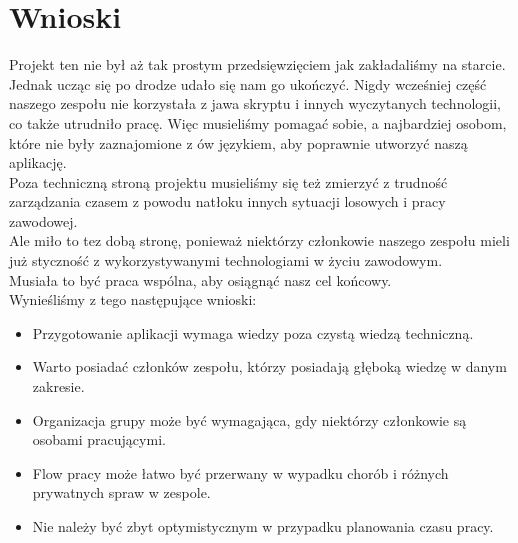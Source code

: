 \documentclass{article}
\begin{document}
\section{Wnioski}
   Projekt ten nie był aż tak prostym przedsięwzięciem jak zakładaliśmy na starcie. Jednak ucząc się po drodze udało się nam go ukończyć. Nigdy wcześniej część naszego zespołu nie korzystała z jawa skryptu i innych wyczytanych technologii, co także utrudniło pracę. Więc musieliśmy pomagać sobie, a najbardziej osobom, które nie były zaznajomione z ów językiem, aby poprawnie utworzyć naszą aplikację.\\
    Poza techniczną stroną projektu musieliśmy się też zmierzyć z trudność zarządzania czasem z powodu natłoku innych sytuacji losowych i pracy zawodowej.\\
    Ale miło to tez dobą stronę, ponieważ niektórzy członkowie naszego zespołu mieli już styczność z wykorzystywanymi technologiami w życiu zawodowym.\\
    Musiała to być praca wspólna, aby osiągnąć nasz cel końcowy.\\
    
    Wynieśliśmy z tego następujące wnioski:\\
    \begin{itemize}
        \item Przygotowanie aplikacji wymaga wiedzy poza czystą wiedzą techniczną.
        \item Warto posiadać członków zespołu, którzy posiadają głęboką wiedzę w danym zakresie.
        \item Organizacja grupy może być wymagająca, gdy niektórzy członkowie są osobami pracującymi.
        \item Flow pracy może łatwo być przerwany w wypadku chorób i różnych prywatnych spraw w zespole.
        \item Nie należy być zbyt optymistycznym w przypadku planowania czasu pracy.
    \end{itemize}
\end{document}
